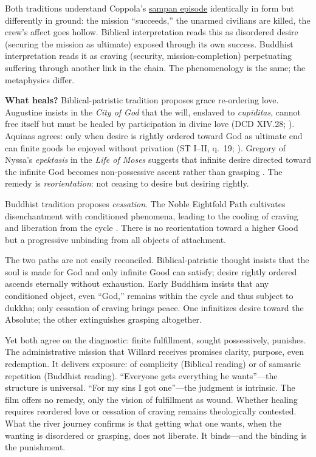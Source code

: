 Both traditions understand Coppola's \hyperref[scene:sampan]{sampan episode} identically in
form but differently in ground: the mission ``succeeds,'' the unarmed civilians are killed,
the crew's affect goes hollow. Biblical interpretation reads this as disordered desire
(securing the mission as ultimate) exposed through its own success. Buddhist interpretation
reads it as craving (security, mission-completion) perpetuating suffering through another link
in the chain. The
phenomenology is the same; the metaphysics differ.

\textbf{What heals?} Biblical-patristic tradition proposes grace re-ordering love. Augustine
insists in the \emph{City of God} that the will, enslaved to \emph{cupiditas}, cannot free
itself but must be healed by participation in divine love (DCD XIV.28;
\parencite{AugustineCity2003}). Aquinas agrees: only when desire is rightly ordered toward God
as ultimate end can finite goods be enjoyed without privation (ST I--II, q.~19;
\parencite{AquinasST1947}). Gregory of Nyssa's \emph{epektasis} in the \emph{Life of Moses}
suggests that infinite desire directed toward the infinite God becomes non-possessive ascent
rather than grasping \parencite[pp.~113--114]{GregoryMoses1978}. The remedy is
\emph{reorientation}: not ceasing to desire but desiring rightly.

Buddhist tradition proposes \emph{cessation}. The Noble Eightfold Path cultivates
disenchantment with conditioned phenomena, leading to the cooling of craving and liberation
from the cycle \parencite[pp.~45--50]{Rahula1959}. There is no reorientation toward a higher
Good but a progressive unbinding from all objects of attachment.

The two paths are not easily reconciled. Biblical-patristic thought insists that the soul is
made for God and only infinite Good can satisfy; desire rightly ordered ascends eternally
without exhaustion. Early Buddhism insists that any conditioned object, even ``God,'' remains
within the cycle and thus subject to dukkha; only cessation of craving brings peace. One
infinitizes desire toward the Absolute; the other extinguishes grasping altogether.

Yet both agree on the diagnostic: finite fulfillment, sought possessively, punishes. The
administrative mission that Willard receives promises clarity, purpose, even redemption. It
delivers exposure: of complicity (Biblical reading) or of samsaric repetition (Buddhist
reading). ``Everyone gets everything he wants''---the structure is universal. ``For my sins I
got one''---the judgment is intrinsic. The film offers no remedy, only the vision of
fulfillment as wound. Whether healing requires reordered love or cessation of craving remains
theologically contested. What the river journey confirms is that getting what one wants, when
the wanting is disordered or grasping, does not liberate. It binds---and the binding is the
punishment.

